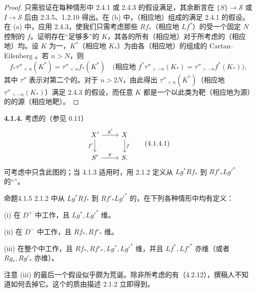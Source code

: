 \begin{proof}
只需验证在每种情形中 2.4.1 或 2.4.3 的假设满足，其余断言在 $\{S\}\to\mathscr S$ 或 $I\to\mathscr S$ 后由 2.3.5、1.2.10 得出。在 (b) 中，（相应地）组成的满足 2.4.1 的假设。在 (a) 中，应用 2.4.3，使我们只需考虑那些 $Rf_*$（相应地 $Lf^*$）的受一个固定 $N$ 控制的 $f$。证明存在“足够多”的 $K$，其各的所有（相应地）对于所考虑的（相应地）均。设 $K$ 为一，$K^*$（相应地 $K_*$）为由各（相应地）的组成的 Cartan--Eilenberg 。若 $n>N$，则
\[f_*\tau''_{<n}(K^*)=\tau''_{<n}f_*(K^*)\quad\bigl(\text{相应地 }f^*\tau''_{>-n}(K_*)=\tau''_{>-n}f^*(K_*)\bigr),\]
其中 $\tau''$ 表示对第二个的。对于 $n>2N$，由此得出 $\tau''_{<n}(K^*)$（相应地 $\tau''_{>-n}(K_*)$）满足 2.4.3 的假设，而任意 $K$ 都是一个以此类为靶（相应地为源）的的源（相应地靶）。
\end{proof}
\textbf{4.1.4.} 考虑的（参见 0.11）
\[\begin{tikzcd}X'\arrow[r,"g'"]\arrow[d,"f'"']&X\arrow[d,"f"]\\S'\arrow[r,"g"]&S.\end{tikzcd}\tag{4.1.4.1}\]
可考虑中只含此图的；当 4.1.3 适用时，用 2.1.2 定义从 $Lg^*Rf_*$ 到 $Rf'_*Lg'^*$ 的“”。
\begin{SGAresult}{命题}{4.1.5}
2.1.2 中从 $Lg^*Rf_*$ 到 $Rf'_*Lg'^*$ 的，在下列各种情形中均有定义：

(i) 在 $D^+$ 中工作，且 $Lg^*,Lg'^*$ 维。

(ii) 在 $D^-$ 中工作，且 $Rf_*,Rf'_*$ 维。

(iii) 在整个中工作，且 $Rf_*,Rf'_*,Lg^*,Lg'^*$ 维，并且 $Lf^*,Lf'^*$ 亦维（或者 $Rg_*,Rg'_*$ 亦维）。
\end{SGAresult}
注意 (iii) 的最后一个假设似乎颇为荒诞。除非所考虑的有（4.2.12），撰稿人不知道如何去掉它。这个的质由描述 2.1.2 立即得到。

